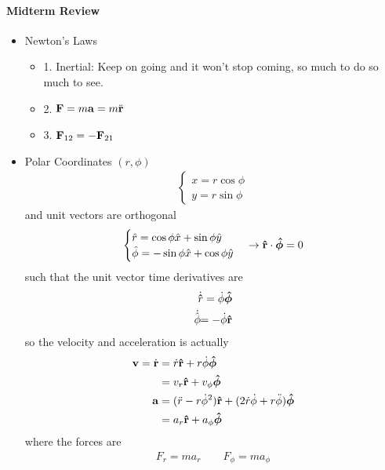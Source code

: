 \documentclass[../main.tex]{subfiles}
\begin{document}
\paragraph{Midterm Review} 
\begin{itemize}
    \item Newton's Laws
    \begin{itemize}
        \item 1. Inertial: Keep on going and it won't stop coming, so much to do so much to see. 
        \item 2. $\vb F =m \vb a = m \ddot{\vb r}$
        \item 3. $\vb F_{12} = -\vb F_{21}$
    \end{itemize}
    \item Polar Coordinates $(r, \phi)$
    \begin{align*}
        \begin{cases}
            x = r\cos\phi \\
            y = r\sin\phi
        \end{cases}
    \end{align*}
    and unit vectors are orthogonal
    \begin{align*}
        \begin{cases}
            \hat r = \cos\phi \hat x + \sin\phi \hat y \\
            \hat \phi = -\sin\phi \hat x + \cos\phi \hat y
        \end{cases}
        \to \vu r \cdot \vu*\phi = 0
    \end{align*}
    such that the unit vector time derivatives are
    \begin{align*}
        \dot{\vu r} = \dot \phi \vu*\phi \\
        \dot{\vu*\phi} = -\dot\phi \vu r
    \end{align*}
    so the velocity and acceleration is actually
    \begin{align*}
        \vb v = \dot{\vb r} &= \dot r \vu r + r \dot\phi \vu*\phi \\
        &= v_r \vu r + v_\phi \vu*\phi \\
        \vb a &= (\ddot r - r \dot\phi^2) \vu r + (2\dot r \dot\phi + r \ddot\phi) \vu*\phi \\
        &= a_r \vu r + a_\phi \vu*\phi
    \end{align*}
    where the forces are
    \begin{align*}
        F_r = ma_r \qquad F_\phi = ma_\phi
    \end{align*}

\end{itemize}
\end{document}
